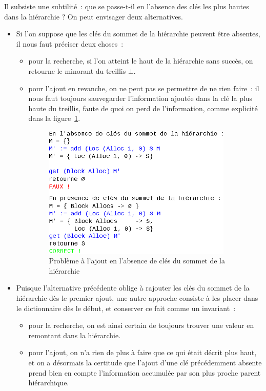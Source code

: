 \documentclass{article}
\begin{document}
Il subsiste une subtilité~: que se passe-t-il en l'absence des clés les plus
hautes dans la hiérarchie ? On peut envisager deux alternatives.

\begin{itemize}

\item Si l'on suppose que les clés du sommet de la hiérarchie peuvent être
absentes, il nous faut préciser deux choses~:

\begin{itemize}

\item pour la recherche, si l'on atteint le haut de la hiérarchie sans succès,
on retourne le minorant du treillis $\bot$.

\item pour l'ajout en revanche, on ne peut pas se permettre de ne rien faire~:
il nous faut toujours sauvegarder l'information ajoutée dans la clé la plus
haute du treillis, faute de quoi on perd de l'information, comme explicité dans
la figure~\ref{add_problem}.

\begin{figure}[ht]
\begin{center}
  \includegraphics[width=9cm]{add_problem.eps}
\end{center}
\caption{Problème à l'ajout en l'absence de clés du sommet de la hiérarchie}
\label{add_problem}
\end{figure}

\end{itemize}

\item Puisque l'alternative précédente oblige à rajouter les clés du sommet
de la hiérarchie dès le premier ajout, une autre approche consiste à les placer
dans le dictionnaire dès le début, et conserver ce fait comme un invariant~:

\begin{itemize}

\item pour la recherche, on est ainsi certain de toujours trouver une valeur
en remontant dans la hiérarchie.

\item pour l'ajout, on n'a rien de plus à faire que ce qui était décrit plus
haut, et on a désormais la certitude que l'ajout d'une clé précédemment absente
prend bien en compte l'information accumulée par son plus proche parent
hiérarchique.

\end{itemize}

\end{itemize}
\end{document}

